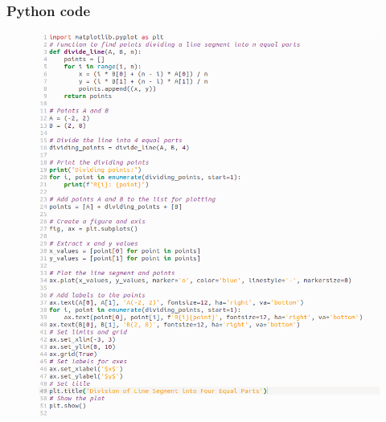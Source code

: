\documentclass{beamer}
\theoremstyle{remark}
\numberwithin{equation}{section}
\begin{document}
\begin{frame}
\frametitle{Python code}
\begin{figure}
    \centering
    \includegraphics[width=0.5\linewidth]{figs/Figure_2.png}
    
    
\end{figure}	
\end{frame}
\end{document}
